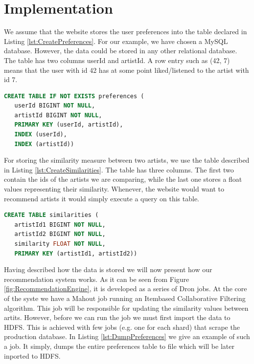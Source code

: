 \documentclass[11pt,a4paper,twoside]{report}
\begin{document}
\section{Implementation}
We assume that the website stores the user preferences into the table declared in Listing \ref{lst:CreatePreferences}. For our example, we have chosen a MySQL database. However, the data could be stored in any other relational database. The table has two columns userId and artistId. A row entry such as (42, 7) means that the user with id 42 has at some point liked/listened to the artist with id 7.\\


\begin{lstlisting}[language=SQL, caption={SQL statement that creates the rpeferences table}, label={lst:CreatePreferences}]
 CREATE TABLE IF NOT EXISTS preferences (
   userId BIGINT NOT NULL,
   artistId BIGINT NOT NULL,
   PRIMARY KEY (userId, artistId),
   INDEX (userId),
   INDEX (artistId))
\end{lstlisting}


For storing the similarity measure between two artists, we use the table described in Listing \ref{lst:CreateSimilarities}. The table has three columns. The first two contain the ids of the artists we are comparing, while the last one stores a float values representing their similarity. Whenever, the website would want to recommend artists it would simply execute a query on this table. \\


\begin{lstlisting}[language=SQL, caption={SQL statement that creates the similarities table}, label={lst:CreateSimilarities}]
 CREATE TABLE similarities (
   artistId1 BIGINT NOT NULL,
   artistId2 BIGINT NOT NULL,
   similarity FLOAT NOT NULL,
   PRIMARY KEY (artistId1, artistId2))
\end{lstlisting}


Having described how the data is stored we will now present how our recommendation system works. As it can be seen from Figure \ref{fig:RecommendationEngine}, it is developed as a series of Dron jobs. At the core of the syste we have a Mahout job running an Itembased Collaborative Filtering algorithm. This job will be responsible for updating the similarity values between artits. However, before we can run the job we must first import the data to HDFS. This is achieved with few jobs (e.g. one for each shard) that scrape the production database. In Listing \ref{lst:DumpPreferences} we give an example of such a job. It simply, dumps the entire preferences table to file which will be later inported to HDFS.\\
\end{document}
